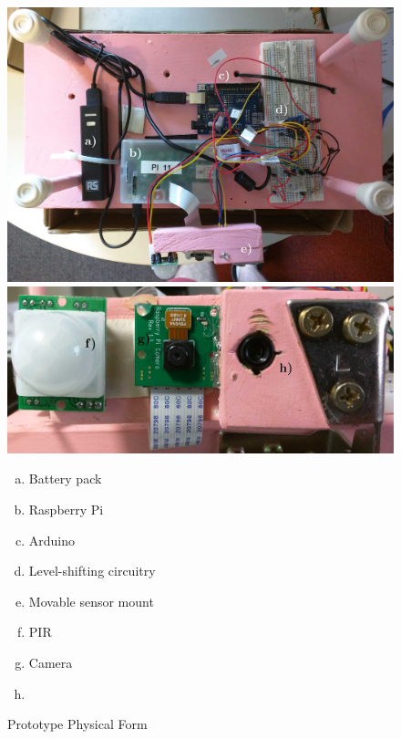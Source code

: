 \begin{figure}[H]
\centering
\includegraphics[width=\textwidth]{../diagrams/prototypeb-1.jpg}
\includegraphics[width=\textwidth]{../diagrams/prototypeb-2.jpg}
{\small
\begin{multicols}{2}
\begin{enumerate}[a)]
 \item Battery pack
 \item Raspberry Pi
 \item Arduino
 \item Level-shifting circuitry
 \item Movable sensor mount
 \item PIR
 \item Camera
 \item \mlx
\end{enumerate}
\end{multicols}
}
\caption{Prototype Physical Form}
\label{fig:pictures:protob1}
\end{figure}